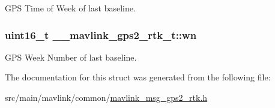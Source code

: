 G\+P\+S Time of Week of last baseline. 

\hypertarget{struct____mavlink__gps2__rtk__t_ab1cbe4fe65cb2ad775c9c47317e9b04b}{
\subsubsection[{wn}]{\setlength{\rightskip}{0pt plus 5cm}uint16\+\_\+t \+\_\+\+\_\+mavlink\+\_\+gps2\+\_\+rtk\+\_\+t\+::wn}}\label{struct____mavlink__gps2__rtk__t_ab1cbe4fe65cb2ad775c9c47317e9b04b}


G\+P\+S Week Number of last baseline. 



The documentation for this struct was generated from the following file\+:\begin{DoxyCompactItemize}
\item 
src/main/mavlink/common/\hyperlink{mavlink__msg__gps2__rtk_8h}{mavlink\+\_\+msg\+\_\+gps2\+\_\+rtk.\+h}\end{DoxyCompactItemize}
